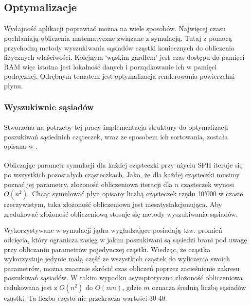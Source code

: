 \par


\subsection{Optymalizacje}

\paragraph{}
Wydajność aplikacji poprawiać można na wiele sposobów. Najwięcej czasu pochłaniają obliczenia matematyczne związane z symulacją. Tutaj z pomocą przychodzą metody wyszukiwania sąsiadów cząstki koniecznych do obliczenia fizycznych właściwości. Kolejnym `wąskim gardłem' jest czas dostępu do pamięci RAM więc istotna jest lokalność danych i porządkowanie ich w pamięci podręcznej. Odrębnym tematem jest optymalizacja renderowania powierzchni płynu.
\par

\subsubsection{Wyszukiwnie sąsiadów}
\label{subsubsec:neighbour_search}

\paragraph{}
Stworzona na potrzeby tej pracy implementacja struktury do optymalizacji poszukiwań sąsiednich cząteczek, wraz ze sposobem ich sortowania, została opisana w \cite{ihmsen13}.
\par

\paragraph{}
Obliczając parametr symulacji dla każdej cząsteczki przy użyciu SPH iteruje się po wszystkich pozostałych cząsteczkach. Jako, że dla każdej cząsteczki musimy poznać jej parametry, złożoność obliczeniowa iteracji dla $n$ cząsteczek wynosi $O(n^2)$. Chcąc symulować płyn opisany liczbą cząsteczek rzędu 10'000 w czasie rzeczywistym, taka złożoność obliczeniowa jest niesatysfakcjonująca. Aby zredukować złożoność obliczeniową stosuje się metody wyszukiwania sąsiadów.
\par
Wykorzystywane w symulacji jądra wygładzające posiadają tzw. promień odcięcia, który ogranicza zasięg w jakim poszukiwani są sąsiedzi brani pod uwagę przy obliczaniu parametrów pojedynczej cząstki. Wiedząc, że cząstka wykorzystuje jedynie małą część ze wszystkich cząstek do wyliczenia swoich parametrów, można znacznie skrócić czas obliczeń poprzez zacieśnienie zakresu poszukiwań sąsiadów. W takim wypadku asymptotyczna złożoność obliczeniowa redukowana jest z $O(n^2)$ do $O(mn)$, gdzie $m$ oznacza średnią liczbę sąsiadów cząstki. Ta liczba często nie przekracza wartości 30-40.
\par

